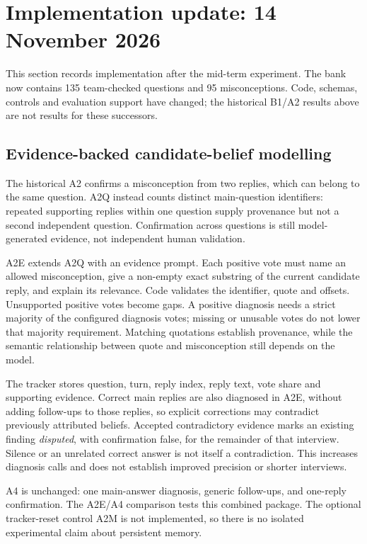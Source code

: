 \clearpage
\section{Implementation update: 14 November 2026}
\label{sec:implementation-update}

This section records implementation after the mid-term experiment. The bank now contains
135 team-checked questions and 95 misconceptions. Code, schemas, controls and evaluation
support have changed; the historical B1/A2 results above are not results for these successors.

\subsection{Evidence-backed candidate-belief modelling}
The historical A2 confirms a misconception from two replies, which can belong to the same
question. A2Q instead counts distinct main-question identifiers: repeated supporting replies
within one question supply provenance but not a second independent question. Confirmation
across questions is still model-generated evidence, not independent human validation.

A2E extends A2Q with an evidence prompt. Each positive vote must name an allowed misconception,
give a non-empty exact substring of the current candidate reply, and explain its relevance.
Code validates the identifier, quote and offsets. Unsupported positive votes become gaps.
A positive diagnosis needs a strict majority of the configured diagnosis votes; missing or
unusable votes do not lower that majority requirement. Matching quotations establish
provenance, while the semantic relationship between quote and misconception still depends on
the model.

The tracker stores question, turn, reply index, reply text, vote share and supporting evidence.
Correct main replies are also diagnosed in A2E, without adding follow-ups to those replies,
so explicit corrections may contradict previously attributed beliefs. Accepted contradictory
evidence marks an existing finding \emph{disputed}, with confirmation false, for the remainder
of that interview. Silence or an unrelated correct answer is not itself a contradiction.
This increases diagnosis calls and does not establish improved precision or shorter interviews.

A4 is unchanged: one main-answer diagnosis, generic follow-ups, and one-reply confirmation.
The A2E/A4 comparison tests this combined package. The optional tracker-reset control A2M
is not implemented, so there is no isolated experimental claim about persistent memory.

